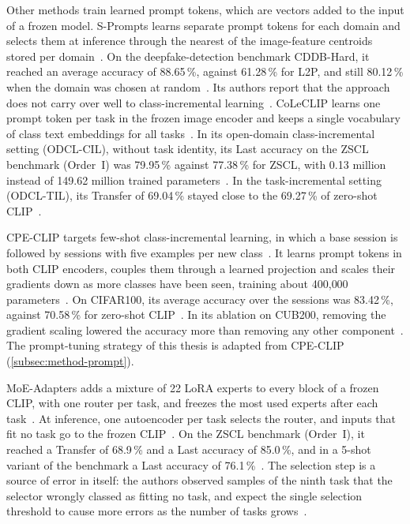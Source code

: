 Other methods train learned prompt tokens, which are vectors added to the input of a frozen model.
S-Prompts learns separate prompt tokens for each domain and selects them at inference through the nearest of the image-feature centroids stored per domain~\cite{wang2023spromptslearningpretrainedtransformers}.
On the deepfake-detection benchmark CDDB-Hard, it reached an average accuracy of 88.65\,\%, against 61.28\,\% for L2P, and still 80.12\,\% when the domain was chosen at random~\cite{wang2023spromptslearningpretrainedtransformers}.
Its authors report that the approach does not carry over well to class-incremental learning~\cite{wang2023spromptslearningpretrainedtransformers}.
CoLeCLIP learns one prompt token per task in the frozen image encoder and keeps a single vocabulary of class text embeddings for all tasks~\cite{li2024coleclipopendomaincontinuallearning}.
In its open-domain class-incremental setting (ODCL-CIL), without task identity, its Last accuracy on the ZSCL benchmark (Order~I) was 79.95\,\% against 77.38\,\% for ZSCL, with 0.13 million instead of 149.62 million trained parameters~\cite{li2024coleclipopendomaincontinuallearning}.
In the task-incremental setting (ODCL-TIL), its Transfer of 69.04\,\% stayed close to the 69.27\,\% of zero-shot CLIP~\cite{li2024coleclipopendomaincontinuallearning}.

CPE-CLIP targets few-shot class-incremental learning, in which a base session is followed by sessions with five examples per new class~\cite{D_Alessandro_2023}.
It learns prompt tokens in both CLIP encoders, couples them through a learned projection and scales their gradients down as more classes have been seen, training about 400{,}000 parameters~\cite{D_Alessandro_2023}.
On CIFAR100, its average accuracy over the sessions was 83.42\,\%, against 70.58\,\% for zero-shot CLIP~\cite{D_Alessandro_2023}.
In its ablation on CUB200, removing the gradient scaling lowered the accuracy more than removing any other component~\cite[Sec.~5.5, Fig.~2]{D_Alessandro_2023}.
The prompt-tuning strategy of this thesis is adapted from CPE-CLIP (\cref{subsec:method-prompt}).

MoE-Adapters adds a mixture of 22 LoRA experts to every block of a frozen CLIP, with one router per task, and freezes the most used experts after each task~\cite{yu2024boostingcontinuallearningvisionlanguage}.
At inference, one autoencoder per task selects the router, and inputs that fit no task go to the frozen CLIP~\cite{yu2024boostingcontinuallearningvisionlanguage}.
On the ZSCL benchmark (Order~I), it reached a Transfer of 68.9\,\% and a Last accuracy of 85.0\,\%, and in a 5-shot variant of the benchmark a Last accuracy of 76.1\,\%~\cite{yu2024boostingcontinuallearningvisionlanguage}.
The selection step is a source of error in itself: the authors observed samples of the ninth task that the selector wrongly classed as fitting no task, and expect the single selection threshold to cause more errors as the number of tasks grows~\cite{yu2024boostingcontinuallearningvisionlanguage}.

